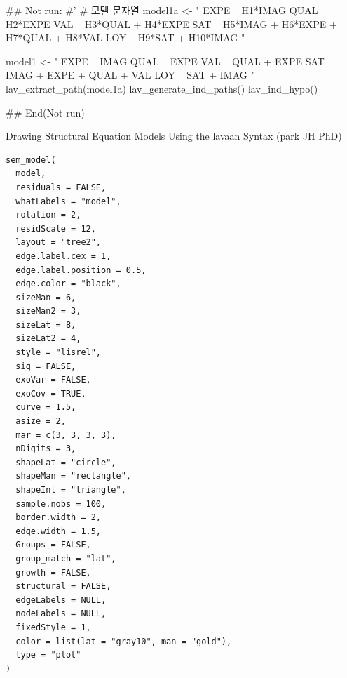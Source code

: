 \documentclass[a4paper]{book}
\begin{document}
%
\begin{Examples}
\begin{ExampleCode}

## Not run: 
#'
# 모델 문자열
model1a <- "
EXPE ~ H1*IMAG
QUAL ~ H2*EXPE
VAL ~ H3*QUAL + H4*EXPE
SAT ~ H5*IMAG + H6*EXPE + H7*QUAL + H8*VAL
LOY ~ H9*SAT + H10*IMAG
"

model1 <- "
EXPE ~ IMAG
QUAL ~ EXPE
VAL ~ QUAL + EXPE
SAT ~ IMAG + EXPE + QUAL + VAL
LOY ~ SAT + IMAG
"
lav_extract_path(model1a)%
  lav_generate_ind_paths() %
  lav_ind_hypo()


## End(Not run)

\end{ExampleCode}
\end{Examples}
%
\begin{Description}
Drawing Structural Equation Models Using the lavaan Syntax (park JH PhD)
\end{Description}
%
\begin{Usage}
\begin{verbatim}
sem_model(
  model,
  residuals = FALSE,
  whatLabels = "model",
  rotation = 2,
  residScale = 12,
  layout = "tree2",
  edge.label.cex = 1,
  edge.label.position = 0.5,
  edge.color = "black",
  sizeMan = 6,
  sizeMan2 = 3,
  sizeLat = 8,
  sizeLat2 = 4,
  style = "lisrel",
  sig = FALSE,
  exoVar = FALSE,
  exoCov = TRUE,
  curve = 1.5,
  asize = 2,
  mar = c(3, 3, 3, 3),
  nDigits = 3,
  shapeLat = "circle",
  shapeMan = "rectangle",
  shapeInt = "triangle",
  sample.nobs = 100,
  border.width = 2,
  edge.width = 1.5,
  Groups = FALSE,
  group_match = "lat",
  growth = FALSE,
  structural = FALSE,
  edgeLabels = NULL,
  nodeLabels = NULL,
  fixedStyle = 1,
  color = list(lat = "gray10", man = "gold"),
  type = "plot"
)
\end{verbatim}
\end{Usage}
%
\end{document}
